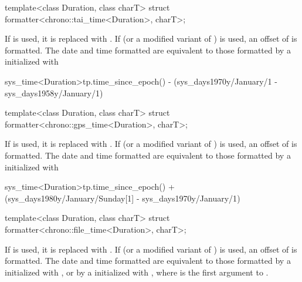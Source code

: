 %
\begin{itemdecl}
template<class Duration, class charT>
  struct formatter<chrono::tai_time<Duration>, charT>;
\end{itemdecl}

\begin{itemdescr}
\pnum
\remarks
If  is used,
it is replaced with .
If  (or a modified variant of ) is used,
an offset of  is formatted.
The date and time formatted are equivalent to
those formatted by a  initialized with
\begin{codeblock}
sys_time<Duration>{tp.time_since_epoch()} -
  (sys_days{1970y/January/1} - sys_days{1958y/January/1})
\end{codeblock}
\end{itemdescr}

%
\begin{itemdecl}
template<class Duration, class charT>
  struct formatter<chrono::gps_time<Duration>, charT>;
\end{itemdecl}

\begin{itemdescr}
\pnum
\remarks
If  is used,
it is replaced with .
If  (or a modified variant of ) is used,
an offset of  is formatted.
The date and time formatted are equivalent to
those formatted by a  initialized with
\begin{codeblock}
sys_time<Duration>{tp.time_since_epoch()} +
  (sys_days{1980y/January/Sunday[1]} - sys_days{1970y/January/1})
\end{codeblock}
\end{itemdescr}

%
\begin{itemdecl}
template<class Duration, class charT>
  struct formatter<chrono::file_time<Duration>, charT>;
\end{itemdecl}

\begin{itemdescr}
\pnum
\remarks
If  is used,
it is replaced with .
If  (or a modified variant of ) is used,
an offset of  is formatted.
The date and time formatted are equivalent to
those formatted
by a  initialized with , or
by a  initialized with ,
where  is the first argument to .
\end{itemdescr}

